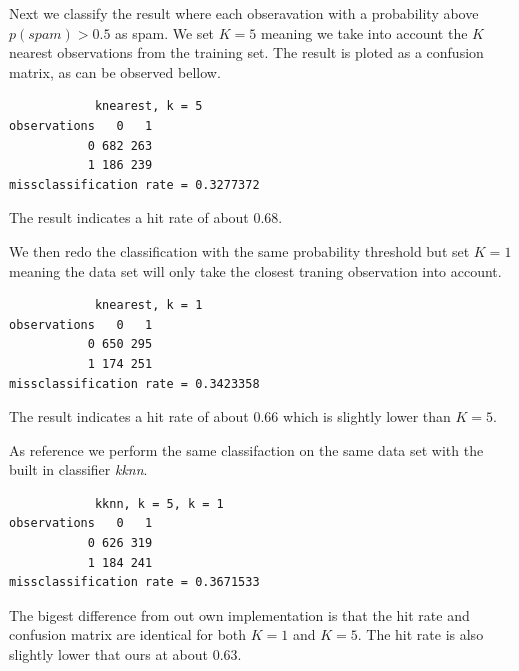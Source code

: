 \documentclass[a4paper,12pt]{article}
\begin{document}
Next we classify the result where each obseravation with a probability above \( p(spam) > 0.5\) as spam. We set \(K = 5\) meaning we take into account the \(K\) nearest observations from the training set. The result is ploted as a confusion matrix, as can be observed bellow. 
\begin{verbatim}
            knearest, k = 5
observations   0   1
           0 682 263
           1 186 239
missclassification rate = 0.3277372
\end{verbatim}
The result indicates a hit rate of about \(0.68\).

We then redo the classification with the same probability threshold but set \(K = 1\) meaning the data set will only take the closest traning observation into account.
\begin{verbatim}
            knearest, k = 1
observations   0   1
           0 650 295
           1 174 251
missclassification rate = 0.3423358
\end{verbatim}
The result indicates a hit rate of about \(0.66\) which is slightly lower than \( K = 5\).

As reference we perform the same classifaction on the same data set with the built in classifier \textit{kknn}. 
\begin{verbatim}
            kknn, k = 5, k = 1
observations   0   1
           0 626 319
           1 184 241
missclassification rate = 0.3671533
\end{verbatim}
The bigest difference from out own implementation is that the hit rate and confusion matrix are identical for both \(K = 1\) and \(K = 5\). The hit rate is also slightly lower that ours at about \( 0.63\).
\end{document}
